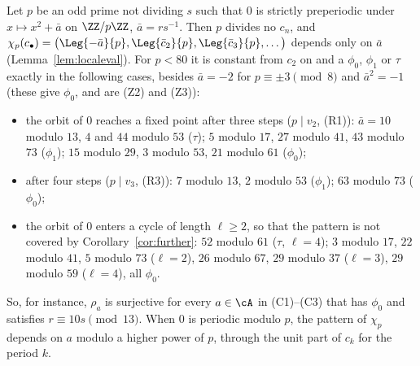 \begin{remark}
  \label{rem:residues}
  Let $p$ be an odd prime not dividing $s$ such that $0$ is strictly preperiodic under
  $x \mapsto x^2 + \bar a$ on $\ZZ/p\ZZ$, $\bar a = r s^{-1}$. Then $p$ divides no $c_n$, and
  $\chi_p(c_\bullet) = \bigl(\Leg{-\bar a}{p}, \Leg{\bar c_2}{p}, \Leg{\bar c_3}{p}, \dots\bigr)$
  depends only on $\bar a$ (Lemma~\ref{lem:localeval}). For $p < 80$ it is constant from $c_2$ on
  and a $\phi_0$, $\phi_1$ or $\tau$ exactly in the following cases, besides $\bar a = -2$ for
  $p \equiv \pm 3 \pmod 8$ and $\bar a^2 = -1$ (these give $\phi_0$, and are (Z2) and (Z3)):
  \begin{itemize}
    \item the orbit of $0$ reaches a fixed point after three steps ($p \mid v_2$, (R1)):
          $\bar a = 10$ modulo $13$, $4$ and $44$ modulo $53$ ($\tau$); $5$ modulo $17$, $27$
          modulo $41$, $43$ modulo $73$ ($\phi_1$); $15$ modulo $29$, $3$ modulo $53$, $21$ modulo
          $61$ ($\phi_0$);
    \item after four steps ($p \mid v_3$, (R3)): $7$ modulo $13$, $2$ modulo $53$ ($\phi_1$); $63$
          modulo $73$ ($\phi_0$);
    \item the orbit of $0$ enters a cycle of length $\ell \ge 2$, so that the pattern is not
          covered by Corollary~\ref{cor:further}: $52$ modulo $61$ ($\tau$, $\ell = 4$); $3$ modulo
          $17$, $22$ modulo $41$, $5$ modulo $73$ ($\ell = 2$), $26$ modulo $67$, $29$ modulo $37$
          ($\ell = 3$), $29$ modulo $59$ ($\ell = 4$), all $\phi_0$.
  \end{itemize}
  So, for instance, $\rho_a$ is surjective for every $a \in \cA$ in (C1)--(C3) that has $\phi_0$
  and satisfies $r \equiv 10 s \pmod{13}$. When $0$ is periodic modulo $p$, the pattern of
  $\chi_p$ depends on $a$ modulo a higher power of $p$, through the unit part of $c_k$ for the
  period $k$.
\end{remark}

